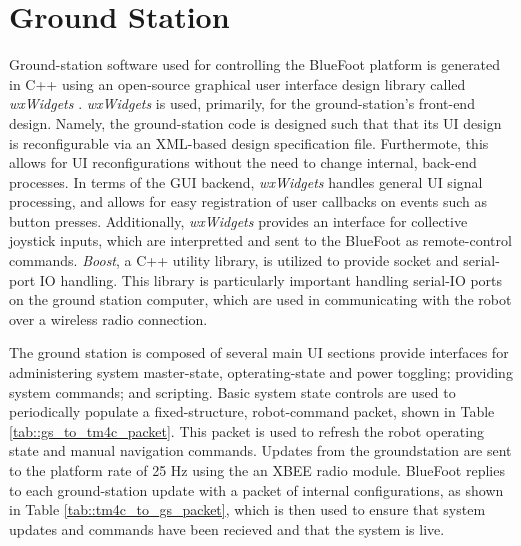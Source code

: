 	\section{Ground Station}
		
	Ground-station software used for controlling the BlueFoot platform is generated in C++ using an open-source graphical user interface design library called \emph{wxWidgets} \cite{WX_Website}. \emph{wxWidgets} is used, primarily, for the ground-station's front-end design. Namely, the ground-station code is designed such that that its UI design is reconfigurable via an XML-based design specification file. Furthermote, this allows for UI reconfigurations without the need to change internal, back-end processes. In terms of the GUI backend, \emph{wxWidgets} handles general UI signal processing, and allows for easy registration of user callbacks on events such as button presses. Additionally, \emph{wxWidgets} provides an interface for collective joystick inputs, which are interpretted and sent to the BlueFoot as remote-control commands. \emph{Boost}, a C++ utility library, is utilized to provide socket and serial-port IO handling. This library is particularly important handling serial-IO ports on the ground station computer, which are used in communicating with the robot over a wireless radio connection.

	The ground station is composed of several main UI sections provide interfaces for administering system master-state, opterating-state and power toggling; providing system commands; and scripting. Basic system state controls are used to periodically populate a fixed-structure, robot-command packet, shown in Table \ref{tab::gs_to_tm4c_packet}. This packet is used to refresh the robot operating state and manual navigation commands. Updates from the groundstation are sent to the platform rate of 25 Hz using the an XBEE radio module. BlueFoot replies to each ground-station update with a packet of internal configurations, as shown in Table \ref{tab::tm4c_to_gs_packet}, which is then used to ensure that system updates and commands have been recieved and that the system is live.

